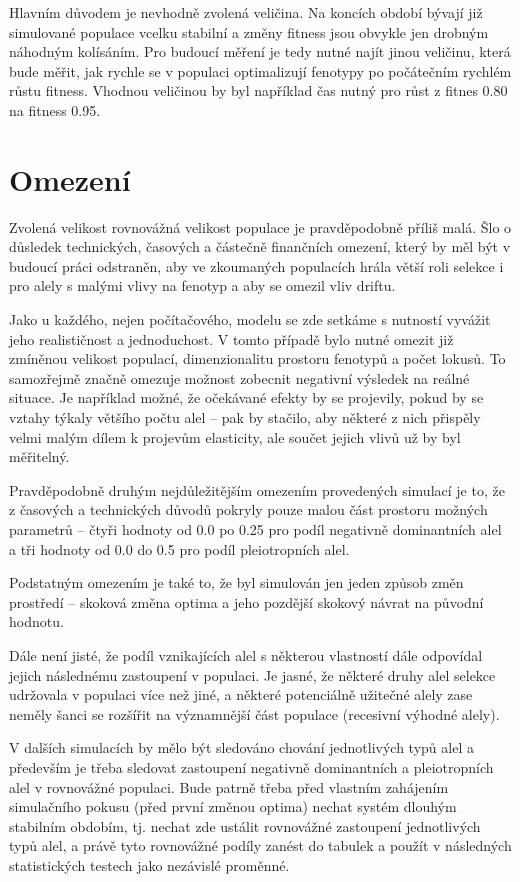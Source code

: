 Hlavním důvodem je nevhodně zvolená veličina. Na koncích období bývají již simulované populace vcelku stabilní a
změny fitness jsou obvykle jen drobným náhodným kolísáním. Pro budoucí měření je tedy nutné najít jinou veličinu,
která bude měřit, jak rychle se v populaci optimalizují fenotypy po počátečním rychlém růstu fitness. Vhodnou veličinou
by byl například čas nutný pro růst z fitnes 0.80 na fitness 0.95.

\section{Omezení}

Zvolená velikost rovnovážná velikost populace je pravděpodobně příliš malá. Šlo o důsledek technických, časových a
částečně finančních omezení, který by měl být v budoucí práci odstraněn, aby ve zkoumaných populacích hrála
větší roli selekce i pro alely s malými vlivy na fenotyp a aby se omezil vliv driftu.

Jako u každého, nejen počítačového, modelu se zde setkáme s nutností vyvážit jeho realističnost a jednoduchost. V
tomto případě bylo nutné omezit již zmíněnou velikost populací, dimenzionalitu prostoru fenotypů a počet lokusů.
To samozřejmě značně omezuje možnost zobecnit negativní výsledek na reálné situace. Je například možné, že očekávané
efekty by se projevily, pokud by se vztahy týkaly většího počtu alel -- pak by stačilo, aby některé z nich přispěly
velmi malým dílem k projevům elasticity, ale součet jejich vlivů už by byl měřitelný.

Pravděpodobně druhým nejdůležitějším omezením provedených simulací je to, že z časových a technických důvodů
pokryly pouze malou část prostoru možných parametrů -- čtyři hodnoty od 0.0 po 0.25 pro podíl negativně dominantních
alel a tři hodnoty od 0.0 do 0.5 pro podíl pleiotropních alel.

Podstatným omezením je také to, že byl simulován jen jeden způsob změn prostředí -- skoková změna optima a jeho
pozdější skokový návrat na původní hodnotu.

Dále není jisté, že podíl vznikajících alel s některou vlastností dále odpovídal jejich následnému zastoupení v
populaci. Je jasné, že některé druhy alel selekce udržovala v populaci více než jiné, a některé potenciálně užitečné
alely zase neměly šanci se rozšířit na významnější část populace (recesivní výhodné alely).

V dalších simulacích by mělo být sledováno chování jednotlivých typů alel a především je třeba sledovat zastoupení
negativně dominantních a pleiotropních alel v rovnovážné populaci.
Bude patrně třeba před vlastním zahájením simulačního pokusu (před první změnou  optima) nechat systém 
dlouhým stabilním obdobím, tj. nechat zde ustálit rovnovážné zastoupení jednotlivých typů alel,
a právě tyto rovnovážné podíly zanést do tabulek a použít v následných statistických testech jako nezávislé proměnné.

